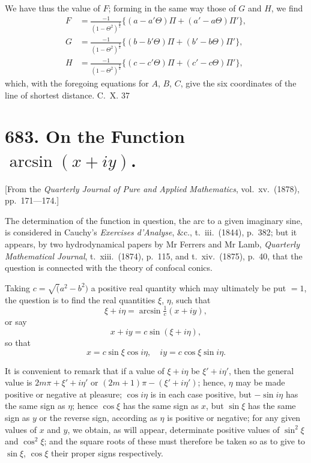 \documentclass[12pt,a4paper]{article}
\theoremstyle{cayley}
\theoremstyle{definition}
\numberwithin{equation}{section}
\begin{document}
We have thus the value of $F$; forming in the same way those of $G$ and $H$, we find
\begin{align*}
F &= \frac{-1}{(1 - \Theta^2)^{\frac{3}{2}}} \{(a - a'\Theta)\Pi + (a' - a\Theta)\Pi'\}, \\
G &= \frac{-1}{(1 - \Theta^2)^{\frac{3}{2}}} \{(b - b'\Theta)\Pi + (b' - b\Theta)\Pi'\}, \\
H &= \frac{-1}{(1 - \Theta^2)^{\frac{3}{2}}} \{(c - c'\Theta)\Pi + (c' - c\Theta)\Pi'\},
\end{align*}
which, with the foregoing equations for $A$, $B$, $C$, give the six coordinates of the line of shortest distance.
\hfill C.~X. 37

\newpage

\section*{683. On the Function $\arcsin(x + iy)$.}

[From the \textit{Quarterly Journal of Pure and Applied Mathematics}, vol.\ xv.\ (1878), pp.\ 171---174.]

The determination of the function in question, the arc to a given imaginary sine, is considered in Cauchy's \textit{Exercises d'Analyse}, \&c., t.\ iii.\ (1844), p.\ 382; but it appears, by two hydrodynamical papers by Mr Ferrers and Mr Lamb, \textit{Quarterly Mathematical Journal}, t.\ xiii.\ (1874), p.\ 115, and t.\ xiv.\ (1875), p.\ 40, that the question is connected with the theory of confocal conics.

Taking $c = \surd(a^2 - b^2)$ a positive real quantity which may ultimately be put $= 1$, the question is to find the real quantities $\xi$, $\eta$, such that
\[
\xi + i\eta = \arcsin \tfrac{1}{c}(x + iy),
\]
or say
\[
x + iy = c \sin(\xi + i\eta),
\]
so that
\[
x = c \sin \xi \cos i\eta, \quad iy = c \cos \xi \sin i\eta.
\]

It is convenient to remark that if a value of $\xi + i\eta$ be $\xi' + i\eta'$, then the general value is $2m\pi + \xi' + i\eta'$ or $(2m + 1)\pi - (\xi' + i\eta')$; hence, $\eta$ may be made positive or negative at pleasure; $\cos i\eta$ is in each case positive, but $-\sin i\eta$ has the same sign as $\eta$; hence $\cos \xi$ has the same sign as $x$, but $\sin \xi$ has the same sign as $y$ or the reverse sign, according as $\eta$ is positive or negative; for any given values of $x$ and $y$, we obtain, as will appear, determinate positive values of $\sin^2 \xi$ and $\cos^2 \xi$; and the square roots of these must therefore be taken so as to give to $\sin \xi$, $\cos \xi$ their proper signs respectively.
\end{document}
